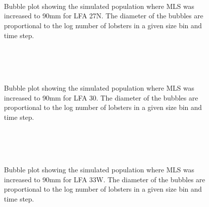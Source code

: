 \documentclass[11pt]{article}
\newcommand{\ebh}{/backup/bio_data/bio.lobster/figures/LFA2733Framework2018/} %
\begin{document}
    \begin{figure}
    \centering
                \\
                \\
                \\
        
         \caption{Bubble plot showing the simulated population where MLS was increased to 90mm for LFA 27N. The diameter of the bubbles are proportional to the log number of lobsters in a given size bin and time step.}
    \end{figure}
    
    \begin{figure}
    \centering
                \\
                \\
                \\
        
         \caption{Bubble plot showing the simulated population where MLS was increased to 90mm for LFA 30. The diameter of the bubbles are proportional to the log number of lobsters in a given size bin and time step.}
    \end{figure}
    
    \begin{figure}
    \centering
                \\
                \\
                \\
        
         \caption{Bubble plot showing the simulated population where MLS was increased to 90mm for LFA 33W. The diameter of the bubbles are proportional to the log number of lobsters in a given size bin and time step.}
    \end{figure}
    
\end{document}
